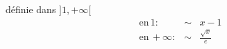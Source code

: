 d\'efinie dans $]1,+\infty[$ 
\begin{eqnarray*}
\mathrm{en}\, 1 : &\sim& x-1 \\
\mathrm{en}\, +\infty : &\sim& \frac{\sqrt x}{e}
\end{eqnarray*}